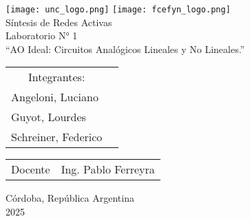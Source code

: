 \documentclass{report}
\begin{document}
\begin{titlepage}
    

\thispagestyle{empty}


	\begin{center}
  	  \texttt{[image: unc\_logo.png]} 
	\vspace{10pt}
 	   \texttt{[image: fcefyn\_logo.png]}
   	 \\[1cm]
  	  \vspace{5pt}
	 \LARGE Síntesis de Redes Activas\\[0.6cm] 
 	    \large Laboratorio N° 1
	    \\[0.8cm]
	    \large “AO Ideal: Circuitos Analógicos Lineales y No Lineales.”
 	   \\[0.2cm]
  	  \vspace{50pt}
	    \begin{table}[!h]
    
  	  \centering
  	  \begin{tabular}{ll}
 	   \multicolumn{1}{c}{Integrantes:} \\
	    Angeloni, Luciano\\
	    Guyot, Lourdes \\
	    Schreiner, Federico
	    \end{tabular}
 	   \end{table}
	    \vspace{20pt}
	    \begin{table}[!h]
 	   \centering
    
	    \begin{tabular}{ll}
	    \multicolumn{1}{c}{Docente} & Ing. Pablo Ferreyra
	    \end{tabular}
	    \end{table}
	    \vfill
 	   Córdoba, República Argentina\\
	    2025\\
	\end{center}

	\end{titlepage}
\end{document}
